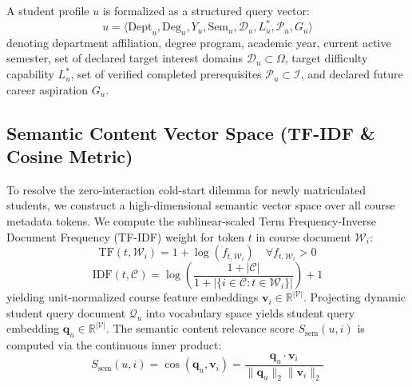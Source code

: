 \documentclass[conference,letterpaper]{IEEEtran}
\begin{document}
A student profile $u$ is formalized as a structured query vector:
\begin{equation}
u = \langle \text{Dept}_u, \text{Deg}_u, Y_u, \text{Sem}_u, \mathcal{D}_u, L_u^*, \mathcal{P}_u, G_u \rangle
\end{equation}
denoting department affiliation, degree program, academic year, current active semester, set of declared target interest domains $\mathcal{D}_u \subset \Omega$, target difficulty capability $L_u^*$, set of verified completed prerequisites $\mathcal{P}_u \subset \mathcal{I}$, and declared future career aspiration $G_u$.

\subsection{Semantic Content Vector Space (TF-IDF \& Cosine Metric)}
To resolve the zero-interaction cold-start dilemma for newly matriculated students, we construct a high-dimensional semantic vector space over all course metadata tokens. We compute the sublinear-scaled Term Frequency-Inverse Document Frequency (TF-IDF) weight for token $t$ in course document $\mathcal{W}_i$:
\begin{equation}
\text{TF}(t, \mathcal{W}_i) = 1 + \log(f_{t, \mathcal{W}_i}) \quad \forall f_{t, \mathcal{W}_i} > 0
\end{equation}
\begin{equation}
\text{IDF}(t, \mathcal{C}) = \log\left(\frac{1 + |\mathcal{C}|}{1 + |\{i \in \mathcal{C} : t \in \mathcal{W}_i\}|}\right) + 1
\end{equation}
yielding unit-normalized course feature embeddings $\mathbf{v}_i \in \mathbb{R}^{|\mathcal{V}|}$. Projecting dynamic student query document $\mathcal{Q}_u$ into vocabulary space yields student query embedding $\mathbf{q}_u \in \mathbb{R}^{|\mathcal{V}|}$. The semantic content relevance score $S_{\text{sem}}(u, i)$ is computed via the continuous inner product:
\begin{equation}
S_{\text{sem}}(u, i) = \cos(\mathbf{q}_u, \mathbf{v}_i) = \frac{\mathbf{q}_u \cdot \mathbf{v}_i}{\|\mathbf{q}_u\|_2 \|\mathbf{v}_i\|_2}
\end{equation}
\end{document}
